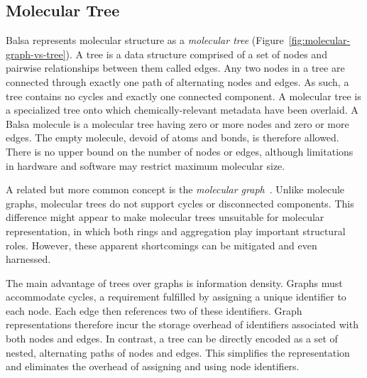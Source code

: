 \documentclass{article}
\begin{document}
\subsection*{Molecular Tree}
\label{molecular-tree}

Balsa represents molecular structure as a \textit{molecular tree} (Figure~\ref{fig:molecular-graph-vs-tree}). A tree is a data structure comprised of a set of nodes and pairwise relationships between them called edges. Any two nodes in a tree are connected through exactly one path of alternating nodes and edges. As such, a tree contains no cycles and exactly one connected component. A molecular tree is a specialized tree onto which chemically-relevant metadata have been overlaid. A Balsa molecule is a molecular tree having zero or more nodes and zero or more edges. The empty molecule, devoid of atoms and bonds, is therefore allowed. There is no upper bound on the number of nodes or edges, although limitations in hardware and software may restrict maximum molecular size.

A related but more common concept is the \textit{molecular graph}~\cite{balaban:1985}. Unlike molecule graphs, molecular trees do not support cycles or disconnected components. This difference might appear to make molecular trees unsuitable for molecular representation, in which both rings and aggregation play important structural roles. However, these apparent shortcomings can be mitigated and even harnessed.

The main advantage of trees over graphs is information density. Graphs must accommodate cycles, a requirement fulfilled by assigning a unique identifier to each node. Each edge then references two of these identifiers. Graph representations therefore incur the storage overhead of identifiers associated with both nodes and edges. In contrast, a tree can be directly encoded as a set of nested, alternating paths of nodes and edges. This simplifies the representation and eliminates the overhead of assigning and using node identifiers. 
\end{document}
